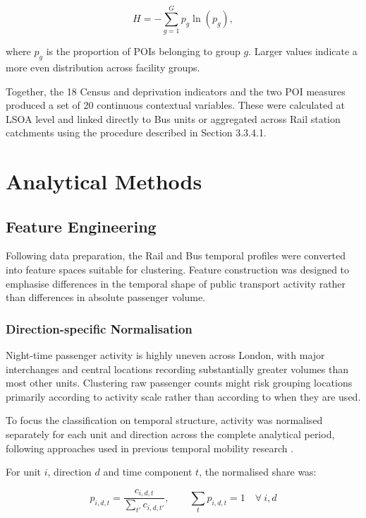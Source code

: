 \begin{equation}
H = -\sum_{g=1}^{G} p_g \ln(p_g),
\end{equation}

where $p_g$ is the proportion of POIs belonging to group $g$. Larger values indicate a more even distribution across facility groups.

Together, the 18 Census and deprivation indicators and the two POI measures produced a set of 20 continuous contextual variables. These were calculated at LSOA level and linked directly to Bus units or aggregated across Rail station catchments using the procedure described in Section 3.3.4.1.

\section{Analytical Methods}

\subsection{Feature Engineering}

Following data preparation, the Rail and Bus temporal profiles were converted into feature spaces suitable for clustering. Feature construction was designed to emphasise differences in the temporal shape of public transport activity rather than differences in absolute passenger volume.

\subsubsection{Direction-specific Normalisation}

Night-time passenger activity is highly uneven across London, with major interchanges and central locations recording substantially greater volumes than most other units. Clustering raw passenger counts might risk grouping locations primarily according to activity scale rather than according to when they are used.

To focus the classification on temporal structure, activity was normalised separately for each unit and direction across the complete analytical period, following approaches used in previous temporal mobility research \citep{Briand2016,ElMahrsi2017,Verma2021}.

For unit $i$, direction $d$ and time component $t$, the normalised share was:

\begin{equation}
p_{i,d,t} = \frac{c_{i,d,t}}{\sum_{t'} c_{i,d,t'}}, \qquad \sum_{t} p_{i,d,t} = 1 \quad \forall\ i,d
\end{equation}

